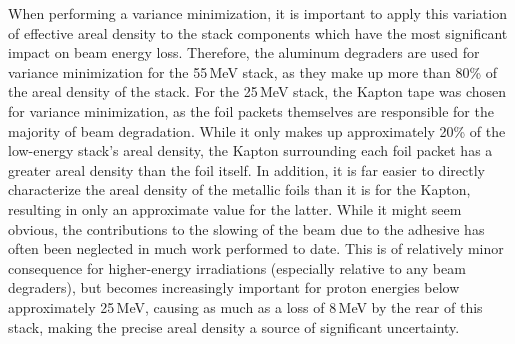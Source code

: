 When performing  a variance minimization, it is important to apply this variation of effective areal density  to the stack components which  have the most significant impact on beam energy loss.
Therefore, the aluminum degraders are used for variance minimization for the 55\,MeV stack, as they make up more than 80\% of the areal density of the stack.
For the 25\,MeV stack, the Kapton tape was chosen for variance minimization, as the foil packets themselves are responsible for the majority of beam degradation.
While it only makes up approximately 20\% of the low-energy stack's areal density, the Kapton surrounding each foil packet has a greater areal density than the foil itself.
In addition, it is far easier to directly characterize the areal density of the metallic foils than it is for the Kapton, resulting in only an approximate value for the latter.
While it might seem obvious, the contributions to the slowing of the beam due to the adhesive has often been neglected in much work performed to date. 
This is of relatively minor consequence for higher-energy irradiations (especially relative to any beam degraders), but 
becomes increasingly important for proton energies below approximately 25\,MeV, causing as much as a loss of 8\,MeV by the rear of this stack, making the precise areal density a source of significant uncertainty.





